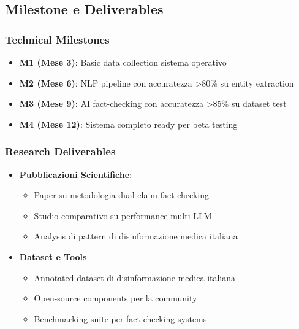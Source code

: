 \documentclass[12pt,a4paper]{report}
\begin{document}
\subsection{Milestone e Deliverables}

\subsubsection{Technical Milestones}

\begin{itemize}
    \item \textbf{M1 (Mese 3)}: Basic data collection sistema operativo
    \item \textbf{M2 (Mese 6)}: NLP pipeline con accuratezza >80\% su entity extraction
    \item \textbf{M3 (Mese 9)}: AI fact-checking con accuratezza >85\% su dataset test
    \item \textbf{M4 (Mese 12)}: Sistema completo ready per beta testing
\end{itemize}

\subsubsection{Research Deliverables}

\begin{itemize}
    \item \textbf{Pubblicazioni Scientifiche}:
    \begin{itemize}
        \item Paper su metodologia dual-claim fact-checking
        \item Studio comparativo su performance multi-LLM
        \item Analysis di pattern di disinformazione medica italiana
    \end{itemize}
    
    \item \textbf{Dataset e Tools}:
    \begin{itemize}
        \item Annotated dataset di disinformazione medica italiana
        \item Open-source components per la community
        \item Benchmarking suite per fact-checking systems
    \end{itemize}
\end{itemize}

\end{document}
